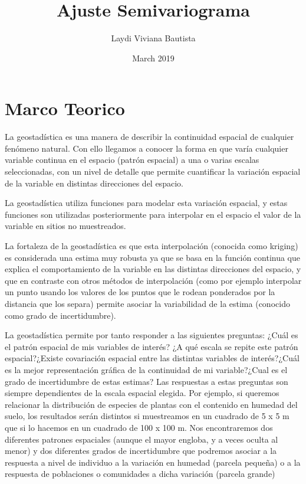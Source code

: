 \documentclass{article}
\title{Ajuste Semivariograma}
\author{Laydi Viviana Bautista}
\date{March 2019}
\begin{document}

\section{Marco Teorico}

La geostadística es una manera de describir la continuidad espacial de cualquier fenómeno natural. Con ello llegamos a conocer la forma en que varía cualquier variable continua en el espacio (patrón espacial) a una o varias escalas seleccionadas, con un nivel de detalle que permite cuantificar la variación espacial de la variable en distintas direcciones del espacio.

La geostadística utiliza funciones para modelar esta variación espacial, y estas funciones son utilizadas posteriormente para interpolar en el espacio el valor de la variable en sitios no muestreados. 

La fortaleza de la geostadística es que esta interpolación (conocida como kriging) es considerada una estima muy robusta ya que se basa en la función continua que explica el comportamiento de la variable en las distintas direcciones del espacio, y que en contraste con otros métodos de interpolación (como por ejemplo interpolar un punto usando los valores de los puntos que le rodean ponderados por la distancia que los separa) permite asociar la variabilidad de la estima (conocido como grado de incertidumbre).

La geostadística permite por tanto responder a las siguientes preguntas: ¿Cuál es el patrón espacial de mis variables de interés? ¿A qué escala se repite este patrón espacial?¿Existe covariación espacial entre las distintas variables de interés?¿Cuál es la
mejor representación gráfica de la continuidad de mi variable?¿Cual es el grado de incertidumbre de estas estimas? Las
respuestas a estas preguntas son siempre dependientes de la escala espacial elegida. Por ejemplo, si queremos relacionar la
distribución de especies de plantas con el contenido en humedad del suelo, los resultados serán distintos si muestreamos en
un cuadrado de 5 x 5 m que si lo hacemos en un cuadrado de 100 x 100 m. Nos encontraremos dos diferentes patrones
espaciales (aunque el mayor engloba, y a veces oculta al menor) y dos diferentes grados de incertidumbre que podremos
asociar a la respuesta a nivel de individuo a la variación en humedad (parcela pequeña) o a la respuesta de poblaciones o
comunidades a dicha variación (parcela grande)
\end{document}
